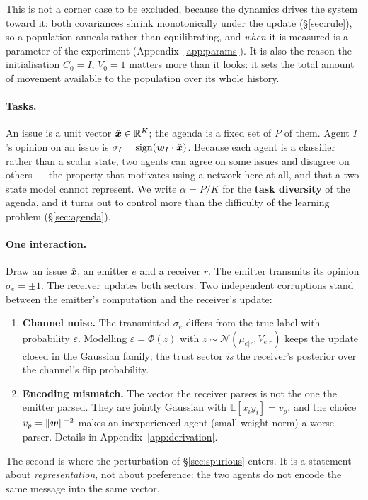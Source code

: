 This is not a corner case to be excluded, because the dynamics drives the system
toward it: both covariances shrink monotonically under the update
(\S\ref{sec:rule}), so a population anneals rather than equilibrating, and
\emph{when} it is measured is a parameter of the experiment
(Appendix~\ref{app:params}). It is also the reason the initialisation
$C_0 = I$, $V_0 = 1$ matters more than it looks: it sets the total amount of
movement available to the population over its whole history.

\paragraph{Tasks.} An issue is a unit vector $\hat{\bm{x}} \in \mathbb{R}^K$; the agenda is
a fixed set of $P$ of them. Agent $I$'s opinion on an issue is
$\sigma_I = \mathrm{sign}(\bm{w}_I \cdot \hat{\bm{x}})$. Because each agent is a classifier
rather than a scalar state, two agents can agree on some issues and disagree on
others --- the property that motivates using a network here at all, and that a
two-state model cannot represent. We write $\alpha = P/K$ for the
\textbf{task diversity} of the agenda, and it turns out to control more than the
difficulty of the learning problem (\S\ref{sec:agenda}).

\paragraph{One interaction.} Draw an issue $\hat{\bm{x}}$, an emitter $e$ and a receiver
$r$. The emitter transmits its opinion $\sigma_e = \pm 1$. The receiver updates
both sectors. Two independent corruptions stand between the emitter's
computation and the receiver's update:

\begin{enumerate}
  \item \textbf{Channel noise.} The transmitted $\sigma_e$ differs from the true
    label with probability $\varepsilon$. Modelling $\varepsilon = \Phi(z)$ with
    $z \sim \mathcal{N}(\mu_{e|r}, V_{e|r})$ keeps the update closed in the
    Gaussian family; the trust sector \emph{is} the receiver's posterior over the
    channel's flip probability.
  \item \textbf{Encoding mismatch.} The vector the receiver parses is not the one
    the emitter parsed. They are jointly Gaussian with $\mathbb{E}[x_i y_i] = v_p$,
    and the choice $v_p = \|\bm{w}\|^{-2}$ makes an inexperienced agent (small weight
    norm) a worse parser. Details in Appendix~\ref{app:derivation}.
\end{enumerate}

The second is where the perturbation of \S\ref{sec:spurious} enters. It is a
statement about \emph{representation}, not about preference: the two agents do not
encode the same message into the same vector.


